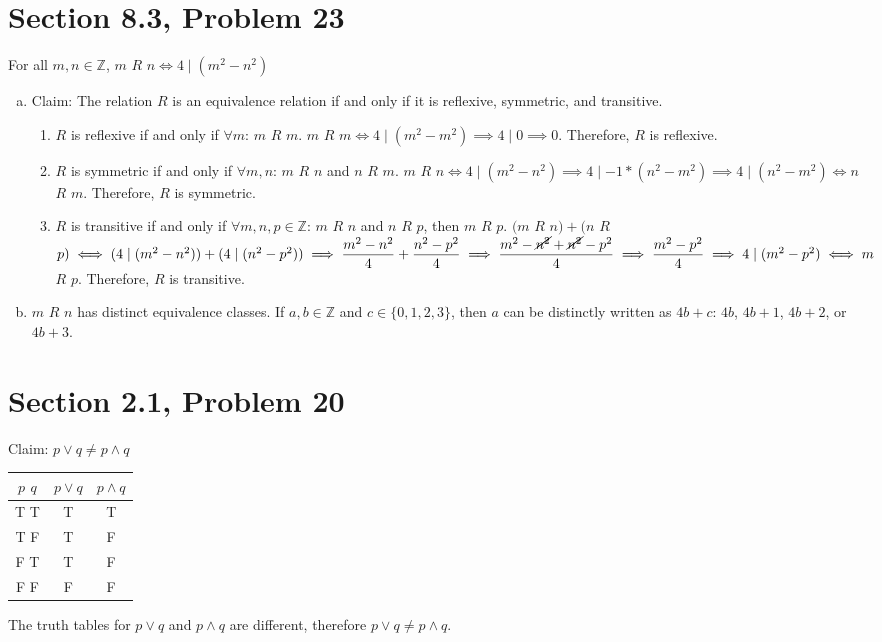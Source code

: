 \documentclass{article}
\begin{document}
\clearpage
\header
\section*{Section 8.3, Problem 23}
For all $m,n \in \mathbb{Z}$, $m$ $R$ $n \iff 4 \mid (m^2 - n^2)$
\begin{enumerate}[(a)]
	\item Claim: The relation $R$ is an equivalence relation if and only if it is reflexive, symmetric, and transitive.
		\begin{enumerate}[1.]
			\item $R$ is reflexive if and only if $\forall m$: $m$ $R$ $m$. $m$ $R$ $m \iff 4\mid (m^2 - m^2) \implies 4\mid 0 \implies 0$. Therefore, $R$ is reflexive.
			\item $R$ is symmetric if and only if $\forall m,n$: $m$ $R$ $n$ and $n$ $R$ $m$. $m$ $R$ $n \iff 4\mid (m^2-n^2) \implies 4\mid -1*(n^2-m^2) \implies 4\mid (n^2-m^2) \iff n$ $R$ $m$. Therefore, $R$ is symmetric.
			\item $R$ is transitive if and only if $\forall m,n,p \in \mathbb{Z}$: $m$ $R$ $n$ and $n$ $R$ $p$, then $m$ $R$ $p$. $(m$ $R$ $n) + (n$ $R$ $p) \iff (4\mid (m^2 - n^2)) + (4\mid (n^2 - p^2)) \implies \dfrac{m^2 - n^2}{4} + \dfrac{n^2 - p^2}{4} \implies \dfrac{m^2-\cancel{n^2}+\cancel{n^2}-p^2}{4} \implies \dfrac{m^2-p^2}{4} \implies 4\mid (m^2 - p^2) \iff m$ $R$ $p$. Therefore, $R$ is transitive.
		\end{enumerate}
	\item $m$ $R$ $n$ has distinct equivalence classes. If $a,b\in \mathbb{Z}$ and $c\in\{0,1,2,3\}$, then $a$ can be distinctly written as $4b+c$: $4b$, $4b+1$, $4b+2$, or $4b+3$. 
\end{enumerate}

\clearpage
\header
\section*{Section 2.1, Problem 20}
Claim: $p\lor q \neq p \wedge q$
\begin{center}
	\begin{tabular}{|c c c|} 
		\hline
		$p$ $q$ & $p\lor q$ & $p \wedge q$ \\ [1ex] 
		\hline
		T T & T & T \\
		\hline
		T F & T & F \\
		\hline
		F T & T & F \\
		\hline
		F F & F & F \\ 
		\hline
	\end{tabular}
\end{center}
The truth tables for $p\lor q$ and $p \wedge q$ are different, therefore $p\lor q \neq p \wedge q$.
\end{document}
